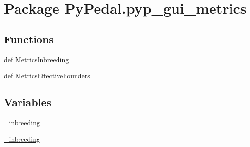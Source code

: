 \hypertarget{namespacePyPedal_1_1pyp__gui__metrics}{
\section{Package Py\-Pedal.pyp\_\-gui\_\-metrics}
\label{namespacePyPedal_1_1pyp__gui__metrics}
}


\subsection*{Functions}
\begin{CompactItemize}
\item 
\hypertarget{namespacePyPedal_1_1pyp__gui__metrics_24319af5e91784badf67cf716656540b}{
def \hyperlink{namespacePyPedal_1_1pyp__gui__metrics_24319af5e91784badf67cf716656540b}{Metrics\-Inbreeding}}
\label{namespacePyPedal_1_1pyp__gui__metrics_24319af5e91784badf67cf716656540b}

\item 
\hypertarget{namespacePyPedal_1_1pyp__gui__metrics_1bdf72e87ee4666f05d0595913c813f7}{
def \hyperlink{namespacePyPedal_1_1pyp__gui__metrics_1bdf72e87ee4666f05d0595913c813f7}{Metrics\-Effective\-Founders}}
\label{namespacePyPedal_1_1pyp__gui__metrics_1bdf72e87ee4666f05d0595913c813f7}

\end{CompactItemize}
\subsection*{Variables}
\begin{CompactItemize}
\item 
\hypertarget{namespacePyPedal_1_1pyp__gui__metrics_ac249d033c9f7340692e06ec2415c6ab}{
\hyperlink{namespacePyPedal_1_1pyp__gui__metrics_ac249d033c9f7340692e06ec2415c6ab}{\_\-inbreeding}}
\label{namespacePyPedal_1_1pyp__gui__metrics_ac249d033c9f7340692e06ec2415c6ab}

\item 
\hypertarget{namespacePyPedal_1_1pyp__gui__metrics_ac249d033c9f7340692e06ec2415c6ab}{
\hyperlink{namespacePyPedal_1_1pyp__gui__metrics_ac249d033c9f7340692e06ec2415c6ab}{\_\-inbreeding}}
\label{namespacePyPedal_1_1pyp__gui__metrics_ac249d033c9f7340692e06ec2415c6ab}

\end{CompactItemize}
